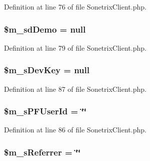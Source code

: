 Definition at line 76 of file SonetrixClient.php.

\hypertarget{classSonetrixClient_a61a6667d5f1e9f48e90a0fc603c20be0}{
\subsubsection[{\$m\_\-sdDemo}]{\setlength{\rightskip}{0pt plus 5cm}\$m\_\-sdDemo = null}}
\label{classSonetrixClient_a61a6667d5f1e9f48e90a0fc603c20be0}


Definition at line 79 of file SonetrixClient.php.

\hypertarget{classSonetrixClient_a83e31531b8c35eca0840ad9bb8d07645}{
\subsubsection[{\$m\_\-sDevKey}]{\setlength{\rightskip}{0pt plus 5cm}\$m\_\-sDevKey = null}}
\label{classSonetrixClient_a83e31531b8c35eca0840ad9bb8d07645}


Definition at line 87 of file SonetrixClient.php.

\hypertarget{classSonetrixClient_aca2665de105ba9e1a89b58722bd21f16}{
\subsubsection[{\$m\_\-sPFUserId}]{\setlength{\rightskip}{0pt plus 5cm}\$m\_\-sPFUserId = \char`\"{}\char`\"{}}}
\label{classSonetrixClient_aca2665de105ba9e1a89b58722bd21f16}


Definition at line 86 of file SonetrixClient.php.

\hypertarget{classSonetrixClient_a251ed856d45aa28d717a012291b71d26}{
\subsubsection[{\$m\_\-sReferrer}]{\setlength{\rightskip}{0pt plus 5cm}\$m\_\-sReferrer = \char`\"{}\char`\"{}}}
\label{classSonetrixClient_a251ed856d45aa28d717a012291b71d26}


